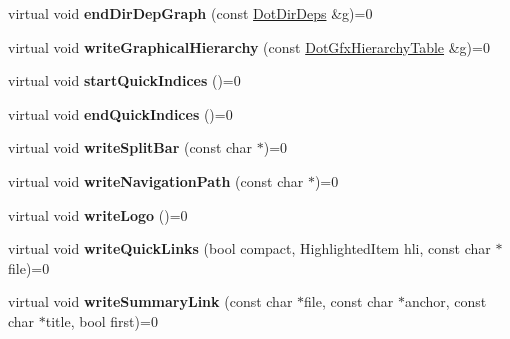 \begin{DoxyCompactItemize}
\item 
\mbox{\label{class_output_generator_a5e97157957f1f86880eae04e4f0a202d}} 
virtual void {\bfseries end\+Dir\+Dep\+Graph} (const \mbox{\hyperlink{class_dot_dir_deps}{Dot\+Dir\+Deps}} \&g)=0
\item 
\mbox{\label{class_output_generator_ae5cf1278fa98872e8e40764af2499558}} 
virtual void {\bfseries write\+Graphical\+Hierarchy} (const \mbox{\hyperlink{class_dot_gfx_hierarchy_table}{Dot\+Gfx\+Hierarchy\+Table}} \&g)=0
\item 
\mbox{\label{class_output_generator_ac1235b655cd828140b9c76f4ca1f4040}} 
virtual void {\bfseries start\+Quick\+Indices} ()=0
\item 
\mbox{\label{class_output_generator_ac772c3fa9b9fb938598b67b8251a1787}} 
virtual void {\bfseries end\+Quick\+Indices} ()=0
\item 
\mbox{\label{class_output_generator_a7ca68513534b42f774af0615039298af}} 
virtual void {\bfseries write\+Split\+Bar} (const char $\ast$)=0
\item 
\mbox{\label{class_output_generator_a782d69569d902413c0029b12cd4ea2d6}} 
virtual void {\bfseries write\+Navigation\+Path} (const char $\ast$)=0
\item 
\mbox{\label{class_output_generator_a4a253e01f787c22716b14709344535ab}} 
virtual void {\bfseries write\+Logo} ()=0
\item 
\mbox{\label{class_output_generator_ade0bf7d098652c8592a8790d6de80a7e}} 
virtual void {\bfseries write\+Quick\+Links} (bool compact, Highlighted\+Item hli, const char $\ast$file)=0
\item 
\mbox{\label{class_output_generator_aa27b1e7554ca5a8f4d80bf82bc1666d6}} 
virtual void {\bfseries write\+Summary\+Link} (const char $\ast$file, const char $\ast$anchor, const char $\ast$title, bool first)=0
\item 
\mbox{\label{class_output_generator_a21231e6bba1594e5327e8e150e39355c}} 

\end{DoxyCompactItemize}
